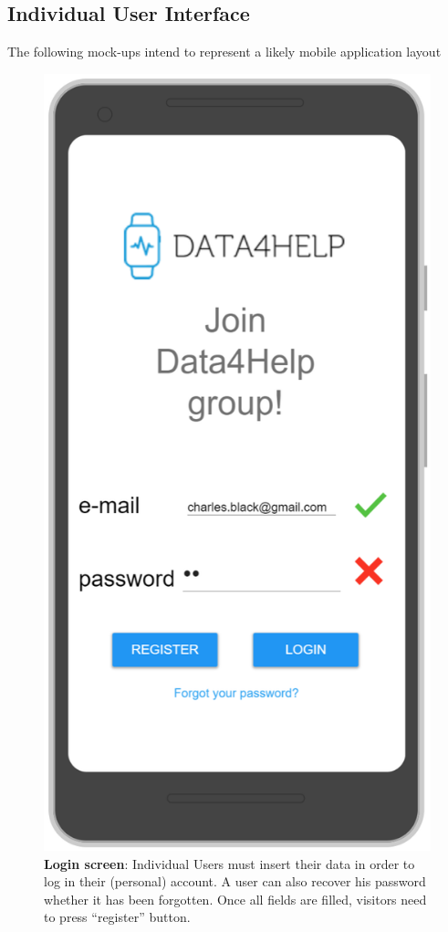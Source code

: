 \subsection{Individual User Interface}
The following mock-ups intend to represent a likely mobile application layout 

\begin{figure}[H]
\centering
\includegraphics[scale = 0.5]{Mocks/Mobile_Login.PNG}
\caption{\textbf{Login screen}: Individual Users must insert their data in order to log in their (personal) account. A user can also recover his password whether it has been forgotten. Once all fields are filled, visitors need to press “register” button.}
\end{figure}


